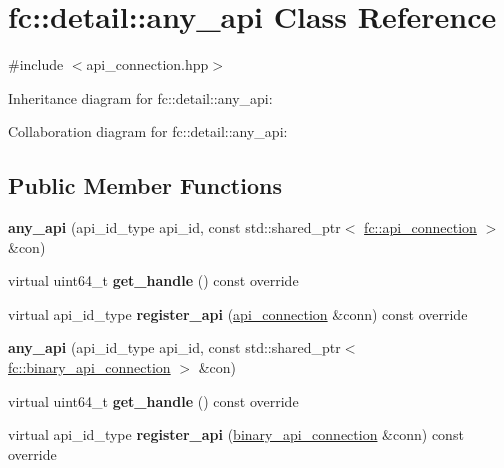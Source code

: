 \hypertarget{classfc_1_1detail_1_1any__api}{}\section{fc\+:\+:detail\+:\+:any\+\_\+api Class Reference}
\label{classfc_1_1detail_1_1any__api}


{\ttfamily \#include $<$api\+\_\+connection.\+hpp$>$}



Inheritance diagram for fc\+:\+:detail\+:\+:any\+\_\+api\+:


Collaboration diagram for fc\+:\+:detail\+:\+:any\+\_\+api\+:
\subsection*{Public Member Functions}
\begin{DoxyCompactItemize}
\item 
\mbox{\label{classfc_1_1detail_1_1any__api_a4ca3597c7722daa10cbe3e780d7a7d36}} 
{\bfseries any\+\_\+api} (api\+\_\+id\+\_\+type api\+\_\+id, const std\+::shared\+\_\+ptr$<$ \mbox{\hyperlink{classfc_1_1api__connection}{fc\+::api\+\_\+connection}} $>$ \&con)
\item 
\mbox{\label{classfc_1_1detail_1_1any__api_a7b5ec2a4fdd53f29b311528c1576aa89}} 
virtual uint64\+\_\+t {\bfseries get\+\_\+handle} () const override
\item 
\mbox{\label{classfc_1_1detail_1_1any__api_a57544c4d7f1dbb7aba824f4a9f618dd4}} 
virtual api\+\_\+id\+\_\+type {\bfseries register\+\_\+api} (\mbox{\hyperlink{classfc_1_1api__connection}{api\+\_\+connection}} \&conn) const override
\item 
\mbox{\label{classfc_1_1detail_1_1any__api_abf5fa014c501ee0bd0447e939de0fd07}} 
{\bfseries any\+\_\+api} (api\+\_\+id\+\_\+type api\+\_\+id, const std\+::shared\+\_\+ptr$<$ \mbox{\hyperlink{classfc_1_1binary__api__connection}{fc\+::binary\+\_\+api\+\_\+connection}} $>$ \&con)
\item 
\mbox{\label{classfc_1_1detail_1_1any__api_a7b5ec2a4fdd53f29b311528c1576aa89}} 
virtual uint64\+\_\+t {\bfseries get\+\_\+handle} () const override
\item 
\mbox{\label{classfc_1_1detail_1_1any__api_a06cabf40fd68e9983f28854d8a1df828}} 
virtual api\+\_\+id\+\_\+type {\bfseries register\+\_\+api} (\mbox{\hyperlink{classfc_1_1binary__api__connection}{binary\+\_\+api\+\_\+connection}} \&conn) const override
\end{DoxyCompactItemize}
